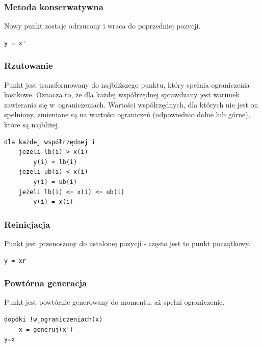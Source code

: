 \documentclass{mini}
\begin{document}
\subsubsection{Metoda konserwatywna}
\hspace{3,4ex}Nowy punkt zostaje odrzucony i wraca do poprzedniej pozycji.

\begin{Verbatim}[baselinestretch=1.1]
y = x'
\end{Verbatim}


\subsubsection{Rzutowanie} \label{secrzut}
\hspace{3,4ex}Punkt jest transformowany do najbliższego punktu, który spełnia ograniczenia kostkowe. Oznacza to, że dla każdej współrzędnej sprawdzany jest warunek zawierania się w~ograniczeniach. Wartości współrzędnych, dla których nie jest on spełniony, zmieniane są na wartości ograniczeń (odpowiednio dolne lub górne), które są najbliżej.

\begin{Verbatim}[baselinestretch=1.1]
dla każdej współrzędnej i
	jeżeli lb(i) > x(i)
		y(i) = lb(i)
	jeżeli ub(i) < x(i)
		y(i) = ub(i)
	jeżeli lb(i) <= x(i) <= ub(i)
		y(i) = x(i)
\end{Verbatim}

\subsubsection{Reinicjacja} \label{reinicjacja}
\hspace{3,4ex}Punkt jest przenoszony do ustalonej pozycji - często jest to punkt początkowy.

\begin{Verbatim}[baselinestretch=1.1]
y = xr
\end{Verbatim}

\subsubsection{Powtórna generacja}
\hspace{3,4ex}Punkt jest powtórnie generowany do momentu, aż spełni ograniczenie.

\begin{Verbatim}[baselinestretch=1.1]
dopóki !w_ograniczeniach(x)
	x = generuj(x')
y=x
\end{Verbatim}
\end{document}
